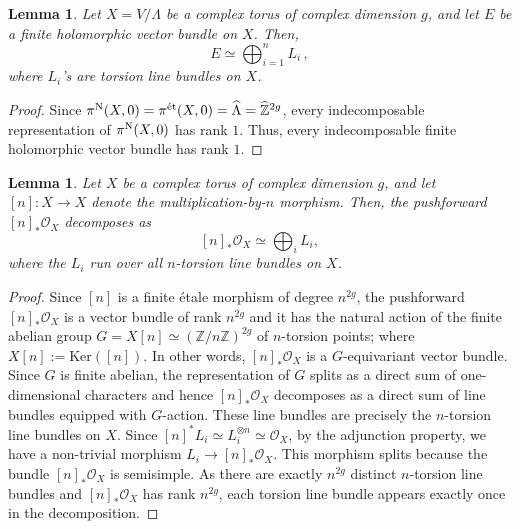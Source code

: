 \documentclass[12pt, reqno]{amsart}
\theoremstyle{plain}
\newtheorem{lemma}[theorem]{Lemma}
\numberwithin{equation}{section}
\begin{document}
\begin{lemma}\label{finite is sum of torsion on torus}
	Let $X=V/\Lambda$ be a complex torus of complex dimension $g$, and let $E$ be a finite holomorphic vector bundle on $X$. Then, 
	$$E\simeq \bigoplus_{i=1}^n L_i\,,$$
	where $L_i$'s are torsion line bundles on $X$.
\end{lemma}
\begin{proof}
Since $\pi^{\rm N}(X, 0)=\pi^{\rm \acute{e}t}(X, 0) =\widehat{\Lambda}=\widehat{\mathbb{Z}}^{2g}$, every indecomposable representation of $\pi^{\rm N}(X, 0)$ has rank $1$. Thus, every indecomposable finite holomorphic vector bundle has rank $1$.
\end{proof}

\begin{lemma}\label{n_*O_X}
Let $X$ be a complex torus of complex dimension $g$, and let $[n]:X\rightarrow X$ denote the multiplication-by-$n$ morphism. Then, the pushforward $[n]_*\mathcal{O}_X$ decomposes as 
$$
	[n]_{*}\mathcal{O}_X \simeq \bigoplus_{i} L_i ,
$$
where the $L_i$ run over all $n$-torsion line bundles on $X$.
\end{lemma}
\begin{proof}
Since $[n]$ is a finite \'etale morphism of degree $n^{2g}$, the pushforward $[n]_{*}\mathcal{O}_X$ is a vector bundle of rank $n^{2g}$ and it has the natural action of the finite abelian group $G = X[n] \simeq (\mathbb{Z}/n\mathbb{Z})^{2g}$ of $n$-torsion points; where $X[n]:= \mathrm{Ker}([n])$. In other words, $[n]_{*}\mathcal{O}_X$ is a $G$-equivariant vector bundle. Since $G$ is finite abelian, the representation of $G$ splits as a direct sum of one-dimensional characters and hence $[n]_{*}\mathcal{O}_X$ decomposes as a direct sum of line bundles equipped with $G$-action. These line bundles are precisely the $n$-torsion line bundles on $X$. Since $[n]^{*}L_i \simeq L_i^{\otimes n} \simeq \mathcal{O}_X$, by the adjunction property, we have a non-trivial morphism $L_i \rightarrow [n]_{*}\mathcal{O}_X$. This morphism splits because the bundle $[n]_*\mathcal{O}_X$ is semisimple. As there are exactly $n^{2g}$ distinct $n$-torsion line bundles and $[n]_{*}\mathcal{O}_X$ has rank $n^{2g}$, each torsion line bundle appears exactly once in the decomposition.
\end{proof}
\end{document}
